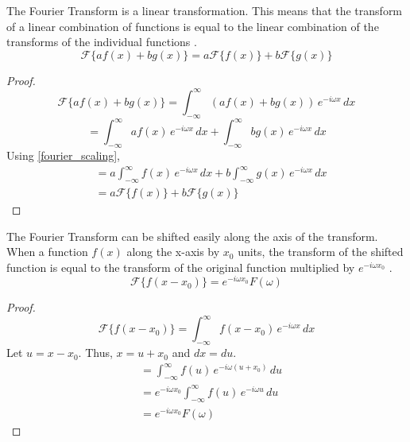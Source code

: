 \begin{theorem}
    \label{fourier_linearity}
    The Fourier Transform is a linear transformation. This means that the transform of a linear combination of functions is equal to the linear combination of the transforms of the individual functions \citep{bahouri2011fourier, 3Blue1Brown_fourier_2018}.
    \begin{equation}
        \mathcal{F}\{ a f(x) + b g(x) \} = a \mathcal{F}\{ f(x) \} + b \mathcal{F}\{ g(x) \}
    \end{equation}
\end{theorem}
\begin{proof}
    \[ \mathcal{F}\{ a f(x) + b g(x) \} = \int_{-\infty}^{\infty} (a f(x) + b g(x)) \, e^{-i \omega x} \,dx \]
    \[ = \int_{-\infty}^{\infty} a f(x) \, e^{-i \omega x} \,dx + \int_{-\infty}^{\infty} b g(x) \, e^{-i \omega x} \,dx \]
    Using \cref{fourier_scaling},
    \begin{align*}
        &= a \int_{-\infty}^{\infty} f(x) \, e^{-i \omega x} \,dx + b \int_{-\infty}^{\infty} g(x) \, e^{-i \omega x} \,dx \\
        &= a \mathcal{F}\{ f(x) \} + b \mathcal{F}\{ g(x) \}
    \end{align*}
\end{proof}


\begin{theorem}
    \label{fourier_shift}
    The Fourier Transform can be shifted easily along the axis of the transform. When a function \(f(x)\) along the x-axis by \(x_0\) units, the transform of the shifted function is equal to the transform of the original function multiplied by $e^{-i \omega x_0}$ \citep{bahouri2011fourier, 3Blue1Brown_fourier_2018}.
    \begin{equation}
        \mathcal{F}\{ f(x - x_0) \} = e^{-i \omega x_0} F(\omega)
    \end{equation}
\end{theorem}

\begin{proof}
    \[ \mathcal{F}\{ f(x - x_0) \} = \int_{-\infty}^{\infty} f(x - x_0) \, e^{-i \omega x} \,dx \]
    Let \(u = x - x_0\). Thus, \(x = u + x_0\) and \(dx = du\).
    \begin{align*}
        &= \int_{-\infty}^{\infty} f(u) \, e^{-i \omega (u + x_0)} \,du \\
        &= e^{-i \omega x_0} \int_{-\infty}^{\infty} f(u) \, e^{-i \omega u} \,du \\
        &= e^{-i \omega x_0} F(\omega)
    \end{align*}
\end{proof}

